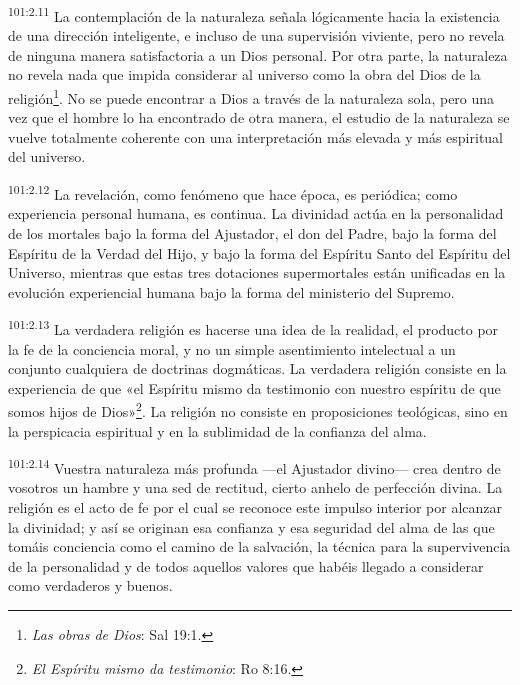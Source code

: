 \par
\textsuperscript{101:2.11} La contemplación de la naturaleza señala lógicamente hacia la existencia de una dirección inteligente, e incluso de una supervisión viviente, pero no revela de ninguna manera satisfactoria a un Dios personal. Por otra parte, la naturaleza no revela nada que impida considerar al universo como la obra del Dios de la religión\footnote{\textit{Las obras de Dios}: Sal 19:1.}. No se puede encontrar a Dios a través de la naturaleza sola, pero una vez que el hombre lo ha encontrado de otra manera, el estudio de la naturaleza se vuelve totalmente coherente con una interpretación más elevada y más espiritual del universo.

\par
\textsuperscript{101:2.12} La revelación, como fenómeno que hace época, es periódica; como experiencia personal humana, es continua. La divinidad actúa en la personalidad de los mortales bajo la forma del Ajustador, el don del Padre, bajo la forma del Espíritu de la Verdad del Hijo, y bajo la forma del Espíritu Santo del Espíritu del Universo, mientras que estas tres dotaciones supermortales están unificadas en la evolución experiencial humana bajo la forma del ministerio del Supremo.

\par
\textsuperscript{101:2.13} La verdadera religión es hacerse una idea de la realidad, el producto por la fe de la conciencia moral, y no un simple asentimiento intelectual a un conjunto cualquiera de doctrinas dogmáticas. La verdadera religión consiste en la experiencia de que «el Espíritu mismo da testimonio con nuestro espíritu de que somos hijos de Dios»\footnote{\textit{El Espíritu mismo da testimonio}: Ro 8:16.}. La religión no consiste en proposiciones teológicas, sino en la perspicacia espiritual y en la sublimidad de la confianza del alma.

\par
\textsuperscript{101:2.14} Vuestra naturaleza más profunda ---el Ajustador divino--- crea dentro de vosotros un hambre y una sed de rectitud, cierto anhelo de perfección divina. La religión es el acto de fe por el cual se reconoce este impulso interior por alcanzar la divinidad; y así se originan esa confianza y esa seguridad del alma de las que tomáis conciencia como el camino de la salvación, la técnica para la supervivencia de la personalidad y de todos aquellos valores que habéis llegado a considerar como verdaderos y buenos.

